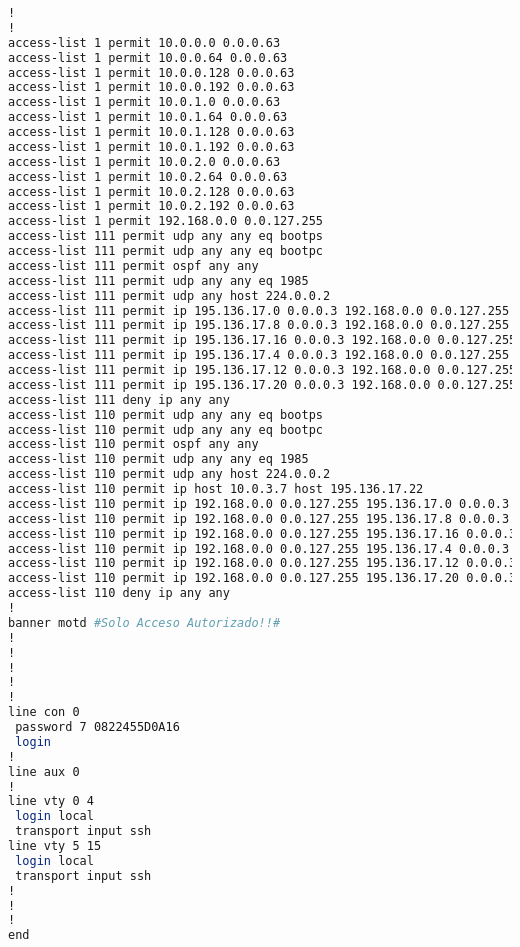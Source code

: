 \begin{lstlisting}[language=Bash, caption={Configuración Completa Router Auxiliar 2}]
!
!
access-list 1 permit 10.0.0.0 0.0.0.63
access-list 1 permit 10.0.0.64 0.0.0.63
access-list 1 permit 10.0.0.128 0.0.0.63
access-list 1 permit 10.0.0.192 0.0.0.63
access-list 1 permit 10.0.1.0 0.0.0.63
access-list 1 permit 10.0.1.64 0.0.0.63
access-list 1 permit 10.0.1.128 0.0.0.63
access-list 1 permit 10.0.1.192 0.0.0.63
access-list 1 permit 10.0.2.0 0.0.0.63
access-list 1 permit 10.0.2.64 0.0.0.63
access-list 1 permit 10.0.2.128 0.0.0.63
access-list 1 permit 10.0.2.192 0.0.0.63
access-list 1 permit 192.168.0.0 0.0.127.255
access-list 111 permit udp any any eq bootps
access-list 111 permit udp any any eq bootpc
access-list 111 permit ospf any any
access-list 111 permit udp any any eq 1985
access-list 111 permit udp any host 224.0.0.2
access-list 111 permit ip 195.136.17.0 0.0.0.3 192.168.0.0 0.0.127.255
access-list 111 permit ip 195.136.17.8 0.0.0.3 192.168.0.0 0.0.127.255
access-list 111 permit ip 195.136.17.16 0.0.0.3 192.168.0.0 0.0.127.255
access-list 111 permit ip 195.136.17.4 0.0.0.3 192.168.0.0 0.0.127.255
access-list 111 permit ip 195.136.17.12 0.0.0.3 192.168.0.0 0.0.127.255
access-list 111 permit ip 195.136.17.20 0.0.0.3 192.168.0.0 0.0.127.255
access-list 111 deny ip any any
access-list 110 permit udp any any eq bootps
access-list 110 permit udp any any eq bootpc
access-list 110 permit ospf any any
access-list 110 permit udp any any eq 1985
access-list 110 permit udp any host 224.0.0.2
access-list 110 permit ip host 10.0.3.7 host 195.136.17.22
access-list 110 permit ip 192.168.0.0 0.0.127.255 195.136.17.0 0.0.0.3
access-list 110 permit ip 192.168.0.0 0.0.127.255 195.136.17.8 0.0.0.3
access-list 110 permit ip 192.168.0.0 0.0.127.255 195.136.17.16 0.0.0.3
access-list 110 permit ip 192.168.0.0 0.0.127.255 195.136.17.4 0.0.0.3
access-list 110 permit ip 192.168.0.0 0.0.127.255 195.136.17.12 0.0.0.3
access-list 110 permit ip 192.168.0.0 0.0.127.255 195.136.17.20 0.0.0.3
access-list 110 deny ip any any
!
banner motd #Solo Acceso Autorizado!!#
!
!
!
!
!
line con 0
 password 7 0822455D0A16
 login
!
line aux 0
!
line vty 0 4
 login local
 transport input ssh
line vty 5 15
 login local
 transport input ssh
!
!
!
end
\end{lstlisting}

